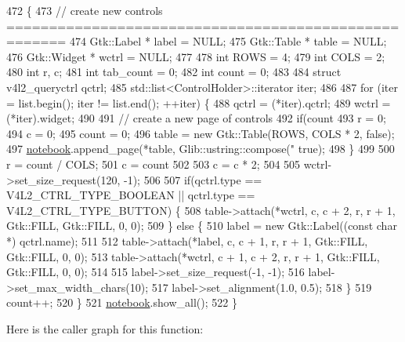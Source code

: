 \begin{DoxyCode}
472                                                                                             \{
473         \textcolor{comment}{// create new controls =====================================================}
474         Gtk::Label * label = NULL;
475         Gtk::Table * table = NULL;
476         Gtk::Widget * wctrl = NULL;
477 
478         \textcolor{keywordtype}{int} ROWS = 4;
479         \textcolor{keywordtype}{int} COLS = 2;
480         \textcolor{keywordtype}{int} r, c;
481         \textcolor{keywordtype}{int} tab\_count = 0;
482         \textcolor{keywordtype}{int} count = 0;
483 
484         \textcolor{keyword}{struct }v4l2\_queryctrl qctrl;
485         std::list<ControlHolder>::iterator iter;
486 
487         \textcolor{keywordflow}{for} (iter = list.begin(); iter != list.end(); ++iter) \{
488             qctrl = (*iter).qctrl;
489             wctrl = (*iter).widget;
490 
491             \textcolor{comment}{// create a new page of controls}
492             \textcolor{keywordflow}{if}(count %
493                 r = 0;
494                 c = 0;
495                 count = 0;
496                 table = \textcolor{keyword}{new} Gtk::Table(ROWS, COLS * 2, \textcolor{keyword}{false});
497                 \hyperlink{class_v_s_s_s___g_u_i_1_1_v4_l_interface_a658017c295c18a779272aa6182664da5}{notebook}.append\_page(*table, Glib::ustring::compose(\textcolor{stringliteral}{"%
      true});
498             \}
499 
500             r = count / COLS;
501             c = count %
502 
503             c = c * 2;
504 
505             wctrl->set\_size\_request(120, -1);
506 
507             \textcolor{keywordflow}{if}(qctrl.type == V4L2\_CTRL\_TYPE\_BOOLEAN || qctrl.type == V4L2\_CTRL\_TYPE\_BUTTON) \{
508                 table->attach(*wctrl, c, c + 2, r, r + 1, Gtk::FILL, Gtk::FILL, 0, 0);
509             \} \textcolor{keywordflow}{else} \{
510                 label = \textcolor{keyword}{new} Gtk::Label((\textcolor{keyword}{const} \textcolor{keywordtype}{char} *) qctrl.name);
511 
512                 table->attach(*label, c, c + 1, r, r + 1, Gtk::FILL, Gtk::FILL, 0, 0);
513                 table->attach(*wctrl, c + 1, c + 2, r, r + 1, Gtk::FILL, Gtk::FILL, 0, 0);
514 
515                 label->set\_size\_request(-1, -1);
516                 label->set\_max\_width\_chars(10);
517                 label->set\_alignment(1.0, 0.5);
518             \}
519             count++;
520         \}
521         \hyperlink{class_v_s_s_s___g_u_i_1_1_v4_l_interface_a658017c295c18a779272aa6182664da5}{notebook}.show\_all();
522     \}
\end{DoxyCode}
Here is the caller graph for this function\+:
\mbox{\label{class_v_s_s_s___g_u_i_1_1_v4_l_interface_ad6eddc5cedbaf1b0e87b330aae937b46}} 
